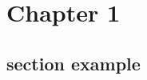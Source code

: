 \chapter{Chapter 1}
{    
    \minitoc%

    \setcounter{page}{1}
    

    \section{section example}
    {
        
    }
}